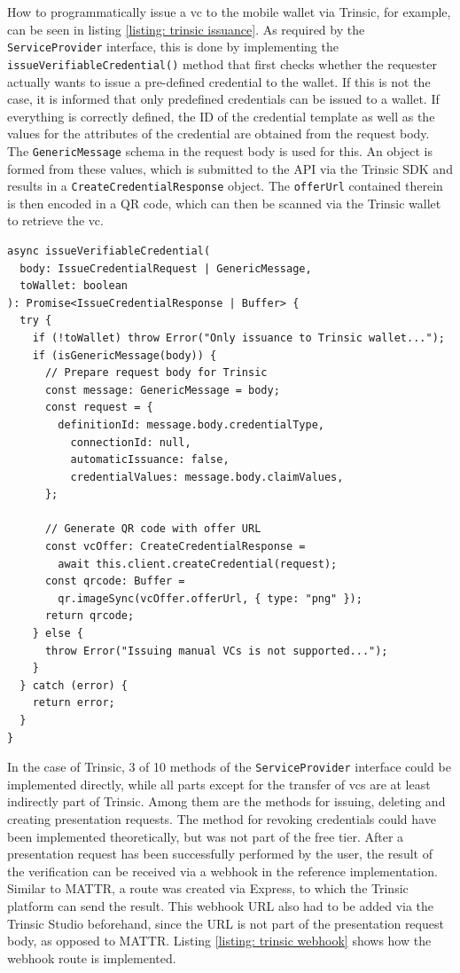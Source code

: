     How to programmatically issue a \ac{vc} to the mobile wallet via Trinsic, for example, can be seen in listing \ref{listing: trinsic issuance}. As required by the \texttt{ServiceProvider} interface, this is done by implementing the \texttt{issueVerifiableCredential()} method that first checks whether the requester actually wants to issue a pre-defined credential to the wallet. If this is not the case, it is informed that only predefined credentials can be issued to a wallet. If everything is correctly defined, the ID of the credential template as well as the values for the attributes of the credential are obtained from the request body. The \texttt{GenericMessage} schema in the request body is used for this. An object is formed from these values, which is submitted to the API via the Trinsic SDK and results in a \texttt{CreateCredentialResponse} object. The \texttt{offerUrl} contained therein is then encoded in a QR code, which can then be scanned via the Trinsic wallet to retrieve the \ac{vc}. 
    \newline
    
    \begin{lstlisting}[style=ES6, caption=\ac{vc} issuance with Trinsic, label={listing: trinsic issuance}]
async issueVerifiableCredential(
  body: IssueCredentialRequest | GenericMessage,
  toWallet: boolean
): Promise<IssueCredentialResponse | Buffer> {
  try {
    if (!toWallet) throw Error("Only issuance to Trinsic wallet...");
    if (isGenericMessage(body)) {
      // Prepare request body for Trinsic
      const message: GenericMessage = body;
      const request = {
        definitionId: message.body.credentialType,
          connectionId: null,
          automaticIssuance: false,
          credentialValues: message.body.claimValues,
      };
      
      // Generate QR code with offer URL
      const vcOffer: CreateCredentialResponse = 
        await this.client.createCredential(request);
      const qrcode: Buffer = 
        qr.imageSync(vcOffer.offerUrl, { type: "png" });
      return qrcode;
    } else {
      throw Error("Issuing manual VCs is not supported...");
    }
  } catch (error) {
    return error;
  }
}\end{lstlisting}

    In the case of Trinsic, 3 of 10 methods of the \texttt{ServiceProvider} interface could be implemented directly, while all parts except for the transfer of \acp{vc} are at least indirectly part of Trinsic. Among them are the methods for issuing, deleting and creating presentation requests. The method for revoking credentials could have been implemented theoretically, but was not part of the free tier. After a presentation request has been successfully performed by the user, the result of the verification can be received via a webhook in the reference implementation. Similar to MATTR, a route was created via Express, to which the Trinsic platform can send the result. This webhook URL also had to be added via the Trinsic Studio beforehand, since the URL is not part of the presentation request body, as opposed to MATTR. Listing \ref{listing: trinsic webhook} shows how the webhook route is implemented.
    \newline
    
